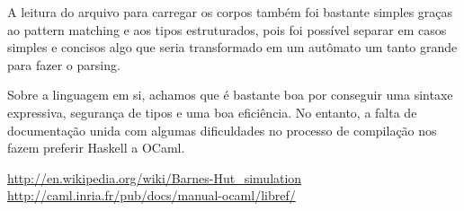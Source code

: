 \documentclass[a4paper,10pt]{article}
\begin{document}
	A leitura do arquivo para carregar os corpos também foi bastante simples graças ao pattern matching e aos tipos estruturados, pois foi possível separar em casos simples e concisos algo que seria transformado em um autômato um tanto grande para fazer o parsing.
	
	Sobre a linguagem em si, achamos que é bastante boa por conseguir uma sintaxe expressiva, segurança de tipos e uma boa eficiência. No entanto, a falta de documentação unida com algumas dificuldades no processo de compilação nos fazem preferir Haskell a OCaml.
	
\begin{thebibliography}{4}
 \url{http://en.wikipedia.org/wiki/Barnes-Hut\_simulation}
 \url{http://caml.inria.fr/pub/docs/manual-ocaml/libref/}
 
\end{thebibliography}
\end{document}

